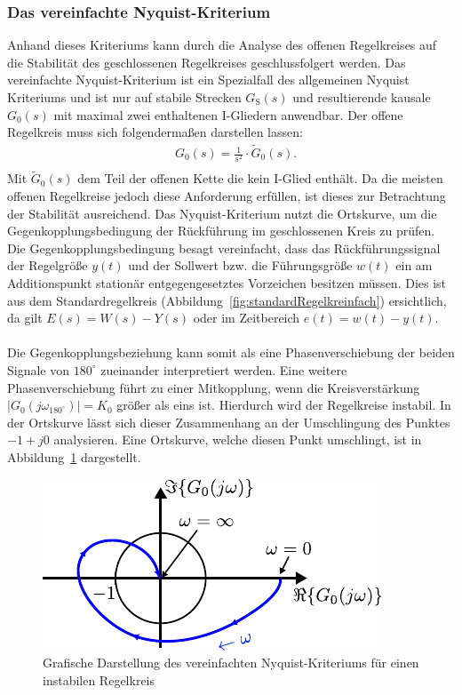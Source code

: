 \subsubsection{Das vereinfachte Nyquist-Kriterium}
%
Anhand dieses Kriteriums kann durch die Analyse des offenen Regelkreises auf die Stabilität des geschlossenen Regelkreises geschlussfolgert werden. Das vereinfachte Nyquist-Kriterium ist ein Spezialfall des allgemeinen Nyquist Kriteriums und ist nur auf stabile Strecken $G_{\text{S}}(s)$ und resultierende kausale $G_{0}(s)$ mit maximal zwei enthaltenen I-Gliedern anwendbar. Der offene Regelkreis muss sich folgendermaßen darstellen lassen: 
%
\begin{equation*}
\begin{aligned}
%
&G_{0}(s)=\frac{1}{s^{2}}\cdot\tilde{G}_{0}(s).\\
%
\end{aligned}
\end{equation*}
%
Mit $\tilde{G}_{0}(s)$ dem Teil der offenen Kette die kein I-Glied enthält. Da die meisten offenen Regelkreise jedoch diese Anforderung erfüllen, ist dieses zur Betrachtung der Stabilität ausreichend. Das Nyquist-Kriterium nutzt die Ortskurve, um die Gegenkopplungsbedingung der Rückführung im geschlossenen Kreis zu prüfen. Die Gegenkopplungsbedingung besagt vereinfacht, dass das Rückführungssignal der Regelgröße $y(t)$ und der Sollwert bzw. die Führungsgröße $w(t)$ ein am Additionspunkt stationär entgegengesetztes Vorzeichen besitzen müssen. Dies ist aus dem Standardregelkreis (Abbildung~\ref{fig:standardRegelkreinfach}) ersichtlich, da gilt $E(s)=W(s)-Y(s)$ oder im Zeitbereich $e(t)=w(t)-y(t)$.\\\\
%
Die Gegenkopplungsbeziehung kann somit als eine Phasenverschiebung der beiden Signale von $180^{\circ}$ zueinander interpretiert werden. Eine weitere Phasenverschiebung führt zu einer Mitkopplung, wenn die Kreisverstärkung $|G_{0}(j\omega_{180^{\circ}})|=K_{0}$ größer als eins ist. Hierdurch wird der Regelkreise instabil. In der Ortskurve lässt sich dieser Zusammenhang an der Umschlingung des Punktes $-1+j0$ analysieren. Eine Ortskurve, welche diesen Punkt umschlingt, ist in Abbildung~\ref{fig:LinkeHandRegel} dargestellt.
%
\begin{figure}[h!]
	\centering
	\includegraphics[width=0.55\linewidth]{Abbildungen/Systemanalyse/PDF/LinkeHandRegel.pdf}
	\caption{Grafische Darstellung des vereinfachten Nyquist-Kriteriums für einen instabilen Regelkreis}
	\label{fig:LinkeHandRegel}
\end{figure}\\
